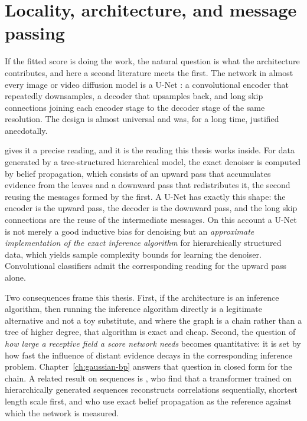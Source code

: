 \section{Locality, architecture, and message passing}
\label{sec:sm-unet}

If the fitted score is doing the work, the natural question is what the
architecture contributes, and here a second literature meets the first. The
network in almost every image or video diffusion model is a U-Net
\citep{ronneberger2015unet}: a convolutional encoder that repeatedly
downsamples, a decoder that upsamples back, and long skip connections joining
each encoder stage to the decoder stage of the same resolution. The design is
almost universal and was, for a long time, justified anecdotally.

\citet{mei2024unets} gives it a precise reading, and it is the reading this
thesis works inside. For data generated by a tree-structured hierarchical
model, the exact denoiser is computed by belief propagation, which consists of
an upward pass that accumulates evidence from the leaves and a downward pass
that redistributes it, the second reusing the messages formed by the first. A
U-Net has exactly this shape: the encoder is the upward pass, the decoder is
the downward pass, and the long skip connections are the reuse of the
intermediate messages. On this account a U-Net is not merely a good inductive
bias for denoising but an \emph{approximate implementation of the exact
inference algorithm} for hierarchically structured data, which yields sample
complexity bounds for learning the denoiser. Convolutional classifiers admit
the corresponding reading for the upward pass alone.

Two consequences frame this thesis. First, if the architecture is an inference
algorithm, then running the inference algorithm directly is a legitimate
alternative and not a toy substitute, and where the graph is a chain rather
than a tree of higher degree, that algorithm is exact and cheap. Second, the
question of \emph{how large a receptive field a score network needs} becomes
quantitative: it is set by how fast the influence of distant evidence decays in
the corresponding inference problem. Chapter~\ref{ch:gaussian-bp} answers that
question in closed form for the chain. A related result on sequences is
\citet{garnierbrun2024transformers}, who find that a transformer trained on
hierarchically generated sequences reconstructs correlations sequentially,
shortest length scale first, and who use exact belief propagation as the
reference against which the network is measured.

